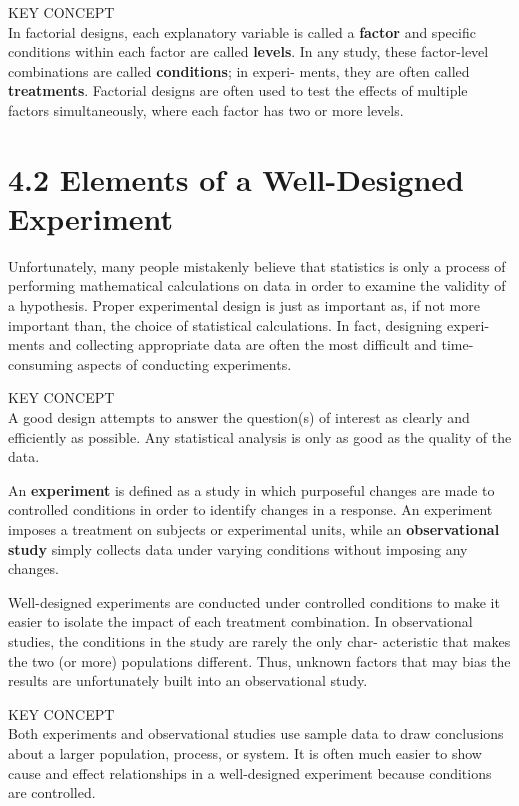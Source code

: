 \documentclass[
]{report}
\begin{document}
KEY CONCEPT\\
In factorial designs, each explanatory variable is called a \textbf{factor} and specific conditions within each
factor are called \textbf{levels}. In any study, these factor-level combinations are called \textbf{conditions}; in experi-
ments, they are often called \textbf{treatments}. Factorial designs are often used to test the effects of multiple
factors simultaneously, where each factor has two or more levels.

\chapter{4.2 Elements of a Well-Designed Experiment}\label{elements-of-a-well-designed-experiment}

Unfortunately, many people mistakenly believe that statistics is only a process of performing mathematical
calculations on data in order to examine the validity of a hypothesis. Proper experimental design is just as
important as, if not more important than, the choice of statistical calculations. In fact, designing experi-
ments and collecting appropriate data are often the most difficult and time-consuming aspects of conducting
experiments.

KEY CONCEPT\\
A good design attempts to answer the question(s) of interest as clearly and efficiently as possible. Any
statistical analysis is only as good as the quality of the data.

An \textbf{experiment} is defined as a study in which purposeful changes are made to controlled conditions in
order to identify changes in a response. An experiment imposes a treatment on subjects or experimental units,
while an \textbf{observational study} simply collects data under varying conditions without imposing any changes.

Well-designed experiments are conducted under controlled conditions to make it easier to isolate the impact
of each treatment combination. In observational studies, the conditions in the study are rarely the only char-
acteristic that makes the two (or more) populations different. Thus, unknown factors that may bias the results
are unfortunately built into an observational study.

KEY CONCEPT\\
Both experiments and observational studies use sample data to draw conclusions about a larger
population, process, or system. It is often much easier to show cause and effect relationships in a
well-designed experiment because conditions are controlled.
\end{document}

